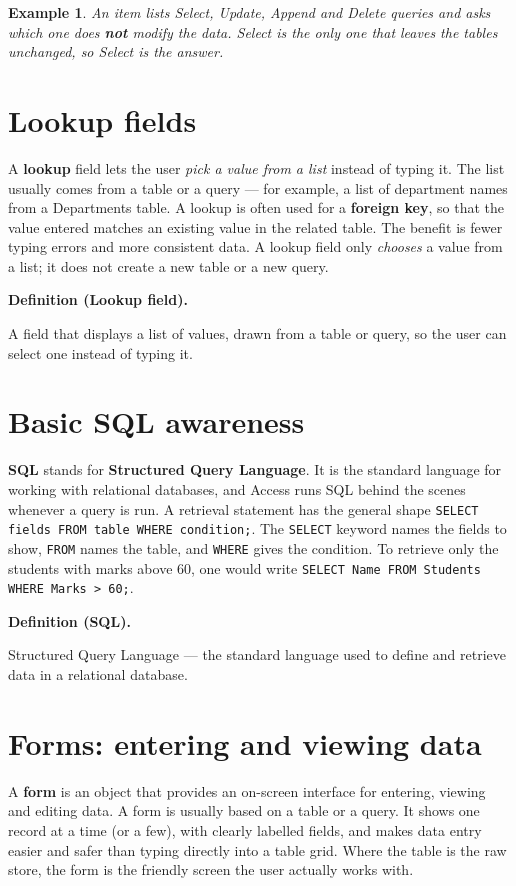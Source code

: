 \documentclass[11pt]{article}
\newtheorem{example}{Example}[section]
\newenvironment{definitionbox}[1]{%
  \par\noindent\textbf{Definition (#1).}\ \itshape
}{\par\vspace{0.3em}}
\begin{document}
\begin{example}
An item lists Select, Update, Append and Delete queries and asks which one
does \textbf{not} modify the data. Select is the only one that leaves the
tables unchanged, so Select is the answer.
\end{example}

\section{Lookup fields}
A \textbf{lookup} field lets the user \emph{pick a value from a list} instead
of typing it. The list usually comes from a table or a query --- for example,
a list of department names from a Departments table. A lookup is often used
for a \textbf{foreign key}, so that the value entered matches an existing
value in the related table. The benefit is fewer typing errors and more
consistent data. A lookup field only \emph{chooses} a value from a list; it
does not create a new table or a new query.

\begin{definitionbox}{Lookup field}
A field that displays a list of values, drawn from a table or query, so the
user can select one instead of typing it.
\end{definitionbox}

\section{Basic SQL awareness}
\textbf{SQL} stands for \textbf{Structured Query Language}. It is the
standard language for working with relational databases, and Access runs SQL
behind the scenes whenever a query is run. A retrieval statement has the
general shape \texttt{SELECT fields FROM table WHERE condition;}. The
\texttt{SELECT} keyword names the fields to show, \texttt{FROM} names the
table, and \texttt{WHERE} gives the condition. To retrieve only the students
with marks above 60, one would write
\texttt{SELECT Name FROM Students WHERE Marks > 60;}.

\begin{definitionbox}{SQL}
Structured Query Language --- the standard language used to define and
retrieve data in a relational database.
\end{definitionbox}

\section{Forms: entering and viewing data}
A \textbf{form} is an object that provides an on-screen interface for
entering, viewing and editing data. A form is usually based on a table or a
query. It shows one record at a time (or a few), with clearly labelled
fields, and makes data entry easier and safer than typing directly into a
table grid. Where the table is the raw store, the form is the friendly
screen the user actually works with.
\end{document}
